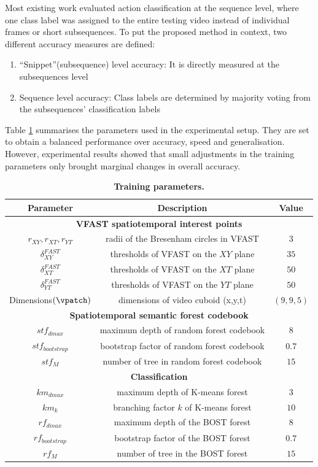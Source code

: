 Most existing work evaluated action classification at the sequence level, where one class label was assigned to the entire testing video instead of individual frames or short subsequences. 
To put the proposed method in context, two different accuracy measures are defined: 
\begin{enumerate}
\item ``Snippet''(subsequence) level accuracy: It is directly measured at the subsequences level 
\item Sequence level accuracy: Class labels are determined by majority voting from the subsequences' classification labels 
\end{enumerate}

Table \ref{tab/act/exparam} summarises the parameters used in the experimental setup. They are set to obtain a balanced performance over accuracy, speed and generalisation. However, experimental results showed that small adjustments in the training parameters only brought marginal changes in overall accuracy. 
\begin{table}
\centering
\begin{tabular}{|c|c|c|}
\hline
\textbf{Parameter} & \textbf{Description} & \textbf{Value} \\
\hline
\multicolumn{3}{|c|}{\textbf{VFAST spatiotemporal interest points}}\\
\hline
$r_{XY}, r_{XT}, r_{YT}$ & radii of the Bresenham circles in VFAST & $3$ \\
$\delta^{FAST}_{XY}$ & thresholds of VFAST on the $XY$ plane& $35$\\
$\delta^{FAST}_{XT}$ & thresholds of VFAST on the $XT$ plane& $50$\\
$\delta^{FAST}_{YT}$ & thresholds of VFAST on the $YT$ plane& $50$\\
Dimensions$(\vpatch)$ & dimensions of video cuboid (x,y,t)& $(9,9,5)$ \\
\hline
\multicolumn{3}{|c|}{\textbf{Spatiotemporal semantic forest codebook}}\\
\hline
$stf_{dmax}$ & maximum depth of random forest codebook & $8$ \\
$stf_{bootstrap}$ & bootstrap factor of random forest codebook & $0.7$ \\
$stf_M$ & number of tree in random forest codebook & $15$ \\
\hline
\multicolumn{3}{|c|}{\textbf{Classification}} \\
\hline
$km_{dmax}$ & maximum depth of K-means forest & $3$ \\
$km_k$ & branching factor $k$ of K-means forest & $10$ \\
$rf_{dmax}$ & maximum depth of the BOST forest & $8$ \\
$rf_{bootstrap}$ & bootstrap factor of the BOST forest& $0.7$ \\
$rf_M$ & number of tree in the BOST forest& $15$ \\ 
\hline
\end{tabular}
\caption{\textbf{Training parameters.}}
\label{tab/act/exparam}
\end{table}


